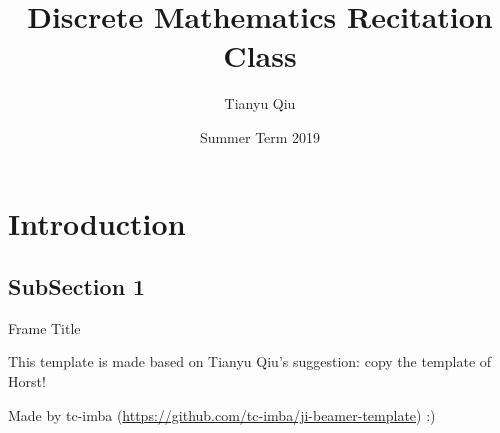 \documentclass[aspectratio=169]{beamer}
\title[VE203]{Discrete Mathematics Recitation Class}
\author[Seven Fish]{Tianyu Qiu}
\institute[UMJI-SJTU]
{
	University of Michigan - Shanghai Jiaotong University
	\\\medskip
	Joint Institute
}
\date{Summer Term 2019}
\begin{document}
\maketitle

\section{Introduction}

\subsection{SubSection 1}

\begin{frame}{Frame Title}
    
This template is made based on Tianyu Qiu's suggestion: copy the template of Horst! \bigskip

Made by tc-imba (\url{https://github.com/tc-imba/ji-beamer-template}) :)
    
\end{frame}
\end{document}
